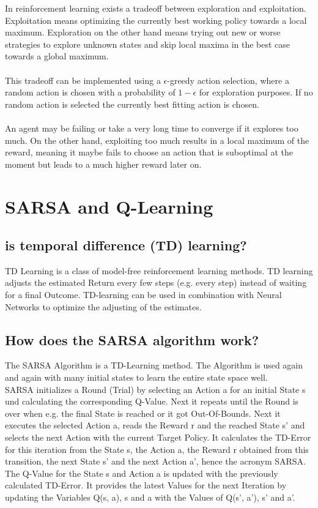 \documentclass[a4paper, 11pt]{article}
\begin{document}
In reinforcement learning exists a tradeoff between exploration and exploitation.
Exploitation means optimizing the currently best working policy towards a local maximum.
Exploration on the other hand means trying out new or worse strategies to explore unknown states and skip local maxima in the best case towards a global maximum.
\\\\
This tradeoff can be implemented using a $\epsilon$-greedy action selection, where a random action is chosen with a probability of $1-\epsilon$ for exploration purposes.
If no random action is selected the currently best fitting action is chosen.
\\\\
An agent may be failing or take a very long time to converge if it explores too much.
On the other hand, exploiting too much results in a local maximum of the reward, meaning it maybe fails to choose an action that is suboptimal at the moment but leads to a much higher reward later on.

\section{SARSA and Q-Learning}
\subsection{is temporal difference (TD) learning?}
TD Learning is a class of model-free reinforcement learning methods. TD learning adjusts the estimated Return every few steps (e.g. every step) instead of waiting for a final Outcome. TD-learning can be used in combination with Neural Networks to optimize the adjusting of the estimates.

\subsection{How does the SARSA algorithm work?}
The SARSA Algorithm is a TD-Learning method. The Algorithm is used again and again with many initial states to learn the entire state space well.\\
SARSA initializes a Round (Trial) by selecting an Action a for an initial State s und calculating the corresponding Q-Value. Next it repeats until the Round is over when e.g. the final State is reached or it got Out-Of-Bounds. Next it executes the selected Action a, reads the Reward r and the reached State s' and selects the next Action with the current Target Policy. It calculates the TD-Error for this iteration from the State s, the Action a, the Reward r obtained from this transition, the next State s' and the next Action a', hence the acronym SARSA. The Q-Value for the State s and Action a is updated with the previously calculated TD-Error.
It provides the latest Values for the next Iteration by updating the Variables Q(s, a), s and a with the Values of Q(s', a'), s' and a'.
\end{document}
